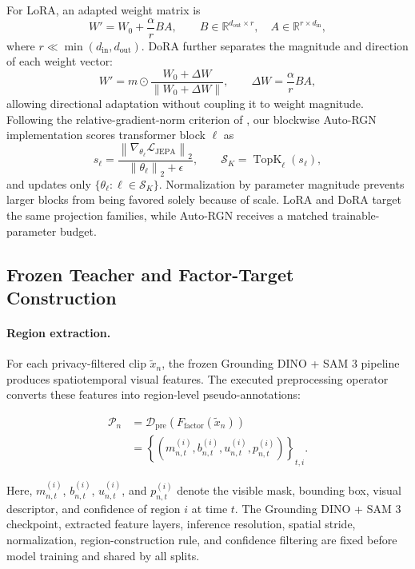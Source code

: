 For LoRA, an adapted weight matrix is
\[
W' = W_0 + \frac{\alpha}{r}BA,
\qquad
B\in\mathbb{R}^{d_{\mathrm{out}}\times r},
\quad
A\in\mathbb{R}^{r\times d_{\mathrm{in}}},
\]
where $r\ll\min(d_{\mathrm{in}},d_{\mathrm{out}})$. DoRA further separates the magnitude and direction of each weight vector:
\[
W'
=
m\odot
\frac{W_0+\Delta W}
{\left\|W_0+\Delta W\right\|},
\qquad
\Delta W=\frac{\alpha}{r}BA,
\]
allowing directional adaptation without coupling it to weight magnitude.
Following the relative-gradient-norm criterion of \citet{lee2023surgical}, our blockwise Auto-RGN implementation scores transformer block $\ell$ as
\[
s_\ell
=
\frac{
\left\|
\nabla_{\theta_\ell}\mathcal{L}_{\mathrm{JEPA}}
\right\|_2
}{
\left\|\theta_\ell\right\|_2+\epsilon
},
\qquad
\mathcal{S}_K
=
\operatorname{TopK}_{\ell}(s_\ell),
\]
and updates only $\{\theta_\ell:\ell\in\mathcal{S}_K\}$. Normalization by parameter magnitude prevents larger blocks from being favored solely because of scale. LoRA and DoRA target the same projection families, while Auto-RGN receives a matched trainable-parameter budget.


\subsection{Frozen Teacher and Factor-Target Construction}
\label{app:factor_targets}

\paragraph{Region extraction.}
For each privacy-filtered clip \(\widetilde x_n\), the frozen Grounding DINO + SAM 3
pipeline~\cite{carion2025sam3} produces spatiotemporal visual features.
The executed preprocessing operator converts these features into
region-level pseudo-annotations:

\begin{equation*}
\begin{aligned}
\mathcal P_n
&=
\mathcal D_{\mathrm{pre}}
\left(
F_{\mathrm{factor}}(\widetilde x_n)
\right)
\\
&=
\left\{
\left(
m_{n,t}^{(i)},
b_{n,t}^{(i)},
u_{n,t}^{(i)},
p_{n,t}^{(i)}
\right)
\right\}_{t,i}.
\end{aligned}
\end{equation*}

Here, \(m_{n,t}^{(i)}\), \(b_{n,t}^{(i)}\),
\(u_{n,t}^{(i)}\), and \(p_{n,t}^{(i)}\) denote the visible mask,
bounding box, visual descriptor, and confidence of region \(i\) at
time \(t\). The Grounding DINO + SAM 3 checkpoint, extracted feature layers, inference
resolution, spatial stride, normalization, region-construction rule,
and confidence filtering are fixed before model training and shared by
all splits.

